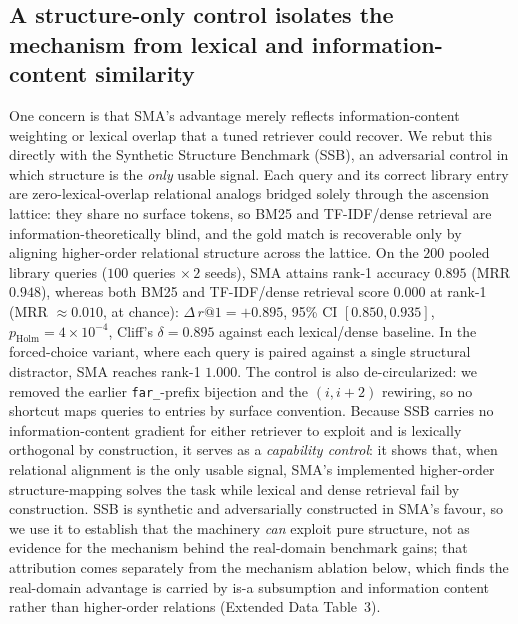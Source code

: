 \documentclass[pdflatex,sn-nature]{sn-jnl}
\begin{document}
\subsection{A structure-only control isolates the mechanism from lexical and information-content similarity}
 One concern is that SMA's advantage merely reflects information-content weighting
or lexical overlap that a tuned retriever could recover. We rebut this directly with the
Synthetic Structure Benchmark (SSB), an adversarial control in which structure is the
\emph{only} usable signal. Each query and its correct library entry are zero-lexical-overlap
relational analogs bridged solely through the ascension lattice: they share no surface tokens,
so BM25 and TF-IDF/dense retrieval are information-theoretically blind, and the gold match is
recoverable only by aligning higher-order relational structure across the lattice. On the
$200$ pooled library queries ($100$ queries $\times\,2$ seeds), SMA attains rank-1 accuracy
$0.895$ (MRR $0.948$), whereas both BM25 and TF-IDF/dense retrieval score $0.000$ at rank-1
(MRR $\approx 0.010$, at chance): $\Delta\,r@1{=}{+}0.895$, 95\% CI $[0.850, 0.935]$,
$p_{\mathrm{Holm}}{=}4{\times}10^{-4}$, Cliff's $\delta{=}0.895$ against each lexical/dense
baseline. In the forced-choice variant, where each query is paired against a single structural
distractor, SMA reaches rank-1 $1.000$. The control is also de-circularized: we removed the
earlier \texttt{far\_}-prefix bijection and the $(i, i{+}2)$ rewiring, so no shortcut maps
queries to entries by surface convention. Because SSB carries no information-content gradient
for either retriever to exploit and is lexically orthogonal by construction, it serves as a
\emph{capability control}: it shows that, when relational alignment is the only usable signal,
SMA's implemented higher-order structure-mapping solves the task while lexical and dense
retrieval fail by construction. SSB is synthetic and adversarially constructed in SMA's
favour, so we use it to establish that the machinery \emph{can} exploit pure structure, not as
evidence for the mechanism behind the real-domain benchmark gains; that attribution comes
separately from the mechanism ablation below, which finds the real-domain advantage is carried
by is-a subsumption and information content rather than higher-order relations (Extended Data
Table~3).
\end{document}
